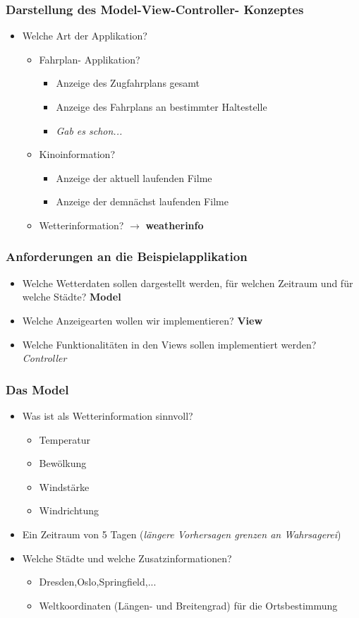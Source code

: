 \begin{frame}
  \frametitle{Darstellung des Model-View-Controller- Konzeptes}
  \begin{itemize}
    \item Welche Art der Applikation?
    \begin{itemize}
      \item Fahrplan- Applikation?
      \begin{itemize}
        \item Anzeige des Zugfahrplans gesamt
        \item Anzeige des Fahrplans an bestimmter Haltestelle
        \item \textit{Gab es schon...}
      \end{itemize}
      \item Kinoinformation?
      \begin{itemize}
        \item Anzeige der aktuell laufenden Filme
        \item Anzeige der demn\"achst laufenden Filme
      \end{itemize}
      \item Wetterinformation? $\rightarrow$ \textbf{weatherinfo}
    \end{itemize}
  \end{itemize}
\end{frame}
\begin{frame}
  \frametitle{Anforderungen an die Beispielapplikation}
  \begin{itemize}
    \item Welche Wetterdaten sollen dargestellt werden, f\"ur welchen Zeitraum und f\"ur welche St\"adte? \textbf{Model}
    \item Welche Anzeigearten wollen wir implementieren? \textbf{View}
    \item Welche Funktionalit\"aten in den Views sollen implementiert werden? \textit{Controller}
  \end{itemize}
\end{frame}
\begin{frame}
  \frametitle{Das Model}
  \begin{itemize}
    \item Was ist als Wetterinformation sinnvoll?
    \begin{itemize}
      \item Temperatur
      \item Bew\"olkung
      \item Windst\"arke
      \item Windrichtung
    \end{itemize}
    \item Ein Zeitraum von 5 Tagen (\textit{l\"angere Vorhersagen grenzen an Wahrsagerei})
    \item Welche St\"adte und welche Zusatzinformationen?
    \begin{itemize}
      \item Dresden,Oslo,Springfield,...
      \item Weltkoordinaten (L\"angen- und Breitengrad) f\"ur die Ortsbestimmung
    \end{itemize}
  \end{itemize}
\end{frame}
